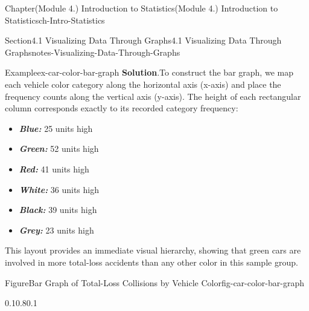 \documentclass[oneside,10pt,]{book}
\newcommand{\blocktitlefont}{\relax}
\newcommand{\ptxlistdisc}{\raisebox{0.3ex}{\textbullet}}
\newcommand{\alert}[1]{\textbf{\textit{#1}}}
\begin{document}
\begin{chapterptx}{Chapter}{(Module 4.) Introduction to Statistics}{}{(Module 4.) Introduction to Statistics}{}{}{ch-Intro-Statistics}
\begin{sectionptx}{Section}{4.1 Visualizing Data Through Graphs}{}{4.1 Visualizing Data Through Graphs}{}{}{notes-Visualizing-Data-Through-Graphs}
\begin{example}{Example}{}{ex-car-color-bar-graph}
\noindent\textbf{\blocktitlefont Solution}.\hypertarget{ex-car-color-bar-graph-2}{}\quad{}To construct the bar graph, we map each vehicle color category along the horizontal axis (x-axis) and place the frequency counts along the vertical axis (y-axis). The height of each rectangular column corresponds exactly to its recorded category frequency:%
\par
%
\begin{itemize}[label=\ptxlistdisc]
\item{}\alert{Blue:} 25 units high%
\item{}\alert{Green:} 52 units high%
\item{}\alert{Red:} 41 units high%
\item{}\alert{White:} 36 units high%
\item{}\alert{Black:} 39 units high%
\item{}\alert{Grey:} 23 units high%
\end{itemize}
%
\par
This layout provides an immediate visual hierarchy, showing that green cars are involved in more total-loss accidents than any other color in this sample group.%
\begin{figureptx}{Figure}{Bar Graph of Total-Loss Collisions by Vehicle Color}{fig-car-color-bar-graph}{}%
\begin{image}{0.1}{0.8}{0.1}{}%
%
\end{image}%
\tcblower
\end{figureptx}%
\end{example}

\end{sectionptx}
\end{chapterptx}
\end{document}

